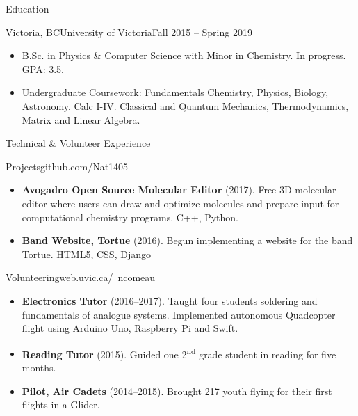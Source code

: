 \documentclass[]{mcdowellcv}
\begin{document}
	\begin{cvsection}{Education}
		\begin{cvsubsection}{Victoria, BC}{University of Victoria}{Fall 2015 -- Spring 2019}
			\begin{itemize}
				\item B.Sc. in Physics \& Computer Science with Minor in Chemistry. In progress.  GPA: 3.5.
				\item Undergraduate Coursework: Fundamentals Chemistry, Physics, Biology, Astronomy. Calc I-IV. Classical and Quantum Mechanics, Thermodynamics, Matrix and Linear Algebra.
			\end{itemize}
		\end{cvsubsection}
	\end{cvsection}
	
	\begin{cvsection}{Technical \& Volunteer Experience}
		\begin{cvsubsection}{Projects}{}{github.com/Nat1405}
			\begin{itemize}
				\item \textbf{Avogadro Open Source Molecular Editor} (2017). Free 3D molecular editor where users can draw and optimize molecules and prepare input for computational chemistry programs.  C++, Python.
				\item \textbf{Band Website, Tortue} (2016). Begun implementing a website for the band Tortue. HTML5, CSS, Django
			\end{itemize}
		\end{cvsubsection}
        \begin{cvsubsection}{Volunteering}{}{web.uvic.ca/~ncomeau}
        	\begin{itemize}
            	\item \textbf{Electronics Tutor} (2016--2017). Taught four students soldering and fundamentals of analogue systems. Implemented autonomous Quadcopter flight using Arduino Uno, Raspberry Pi and Swift.
                \item \textbf{Reading Tutor} (2015). Guided one 2\textsuperscript{nd} grade student in reading for five months.
                \item \textbf{Pilot, Air Cadets} (2014--2015). Brought 217 youth flying for their first flights in a Glider.
            \end{itemize}
        
        \end{cvsubsection}
	\end{cvsection}
	
\end{document}
